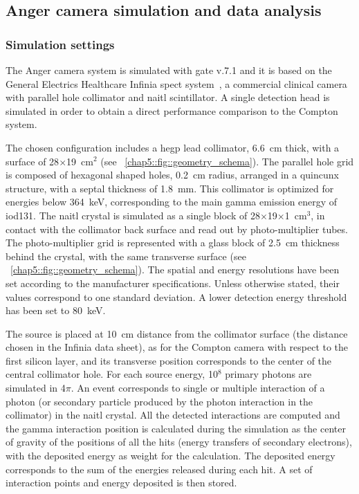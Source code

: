 \subsection{Anger camera simulation and data analysis}\label{chap5::subsec::Anger_descr}

\subsubsection{Simulation settings}\label{chap5::subsubsec::AC_settings}
The Anger camera system is simulated with \gls{gate} v.7.1 and it is based on the General Electrics Healthcare Infinia \gls{spect} system~\parencite{GeneralElectrics2006}, a commercial clinical camera with parallel hole collimator and \gls{naitl} scintillator. A single detection head is simulated in order to obtain a direct performance comparison to the Compton system.

The chosen configuration includes a \gls{hegp} lead collimator, 6.6~cm thick, with a surface of 28$\times$19~cm$^{2}$ (see \figurename~\ref{chap5::fig::geometry_schema}). The parallel hole grid is composed of hexagonal shaped holes, 0.2~cm radius, arranged in a quincunx structure, with a septal thickness of 1.8~mm. This collimator is optimized for energies below 364~keV, corresponding to the main gamma emission energy of \gls{iod131}. The \gls{naitl} crystal is simulated as a single block of 28$\times$19$\times$1~cm$^{3}$, in contact with the collimator back surface and read out by photo-multiplier tubes. The photo-multiplier grid is represented with a glass block of 2.5~cm thickness behind the crystal, with the same transverse surface (see \figurename~\ref{chap5::fig::geometry_schema}). The spatial and energy resolutions have been set according to the manufacturer specifications. Unless otherwise stated, their values correspond to one standard deviation. A lower detection energy threshold has been set to 80~keV.

The source is placed at 10~cm distance from the collimator surface (the distance chosen in the Infinia data sheet), as for the Compton camera with respect to the first silicon layer, and its transverse position corresponds to the center of the central collimator hole. For each source energy, 10$^{8}$ primary photons are simulated in 4$\pi$. An event corresponds to single or multiple interaction of a photon (or secondary particle produced by the photon interaction in the collimator) in the \gls{naitl} crystal. All the detected interactions are computed and the gamma interaction position is calculated during the simulation as the center of gravity of the positions of all the hits (energy transfers of secondary electrons), with the deposited energy as weight for the calculation. The deposited energy corresponds to the sum of the energies released during each hit. A set of interaction points and energy deposited is then stored. 

